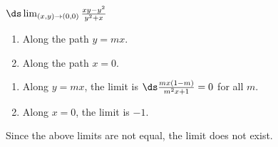 {$\ds \lim_{(x,y)\to(0,0)} \frac{xy-y^2}{y^2+x}$
\begin{enumerate}
	\item Along the path $y=mx$.
	\item Along the path $x=0$.
\end{enumerate}}
{\begin{enumerate}
	\item Along $y=mx$, the limit is $\ds\frac{mx(1-m)}{m^2x+1}=0$ for all $m$.
	\item	Along $x=0$, the limit is $-1$.
\end{enumerate}
Since the above limits are not equal, the limit does not exist.
}